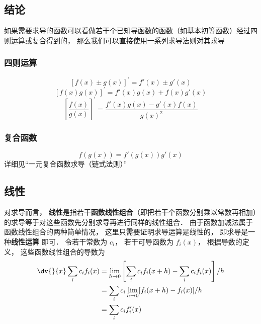 
\subsection{结论}
如果需要求导的函数可以看做若干个已知导函数的函数（如基本初等函数）经过四则运算或复合得到的， 那么我们可以直接使用一系列求导法则对其求导
\subsubsection{四则运算}
\begin{equation}
{\left[ {f\left( x \right) \pm g\left( x \right)} \right]^\prime } = f'\left( x \right) \pm g'\left( x \right)
\end{equation}
\begin{equation}
{\left[ {f\left( x \right)g\left( x \right)} \right]^\prime } = f'\left( x \right)g\left( x \right) + f\left( x \right)g'\left( x \right) 
\end{equation}
\begin{equation}
{\left[ {\frac{{f\left( x \right)}}{{g\left( x \right)}}} \right]^\prime } = \frac{{f'\left( x \right)g\left( x \right) - g'\left( x \right)f\left( x \right)}}{{g{{\left( x \right)}^2}}}
\end{equation}
\subsubsection{复合函数}
\begin{equation}
f\left( {g\left( x \right)} \right) = f'\left( {g\left( x \right)} \right)g'\left( x \right)
\end{equation}
详细见“一元复合函数求导（链式法则）”

\subsection{线性}
对求导而言， \textbf{线性}是指若干\textbf{函数线性组合}（即把若干个函数分别乘以常数再相加）的求导等于对这些函数先分别求导再进行同样的线性组合． 由于函数加减法属于函数线性组合的两种简单情况， 这里只需要证明求导运算是线性的， 即求导是一种\textbf{线性运算} 即可．  令若干常数为 $c_i$， 若干可导函数为 $f_i(x)$， 根据导数的定义， 这些函数线性组合的导数为
\begin{equation}\begin{aligned}
\dv{}{x}\sum_i c_i f_i(x) &= \lim_{h\to 0}\left[\sum_i c_i f_i(x+h) - \sum_i c_i f_i(x)\right]/h\\
& =  \sum_i {c_i \lim_{h\to 0} [f_i(x+h) - f_i(x)]/h} \\
& = \sum_i {c_i f_i'(x)}
\end{aligned}\end{equation}

